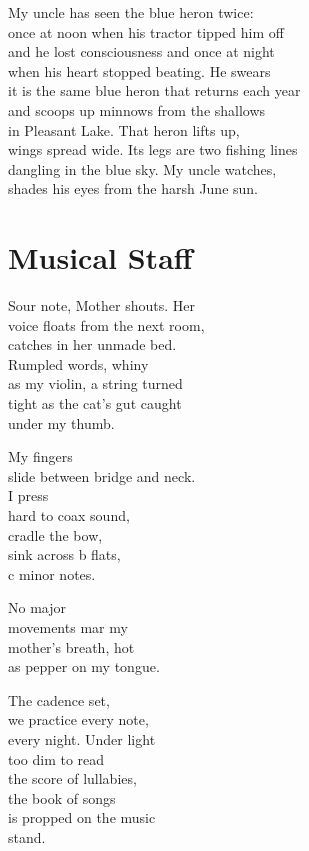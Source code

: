 \documentclass[twoside,10pt]{book}
\begin{document}
My uncle has seen the blue heron twice:\\
once at noon when his tractor tipped him off\\
and he lost consciousness and once at night\\
when his heart stopped beating. He swears\\
it is the same blue heron that returns each year\\
and scoops up minnows from the shallows\\
in Pleasant Lake. That heron lifts up,\\
wings spread wide. Its legs are two fishing lines\\
dangling in the blue sky. My uncle watches,\\
shades his eyes from the harsh June sun.


\clearpage
\section{Musical Staff}

Sour note, Mother shouts. Her\\
voice floats from the next room,\\
catches in her unmade bed.\\
Rumpled words, whiny\\
as my violin, a string turned\\
tight as the cat's gut caught\\
under my thumb.

My fingers\\
slide between bridge and neck.\\
I press\\
hard to coax sound,\\
cradle the bow,\\
sink across b flats,\\
c minor notes.

No major\\
movements mar my\\
mother's breath, hot\\
as pepper on my tongue.

The cadence set,\\
we practice every note,\\
every night. Under light\\
too dim to read\\
the score of lullabies,\\
the book of songs\\
is propped on the music\\
stand.
\end{document}
